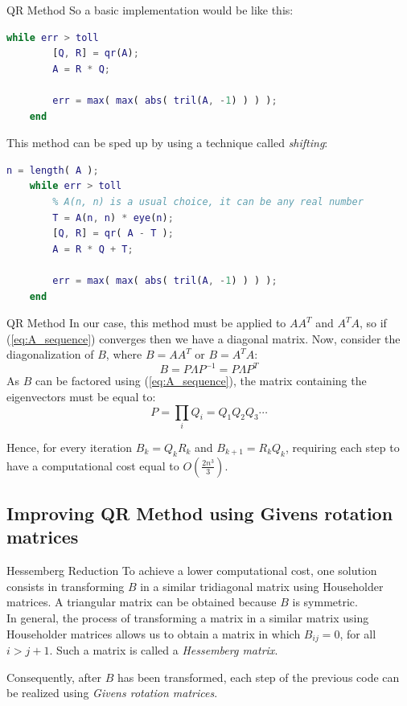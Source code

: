 \documentclass[10pt]{beamer}
\begin{document}
\begin{frame}[fragile]{QR Method}
    So a basic implementation would be like this:
    \begin{lstlisting}[language=Matlab]
    while err > toll
        [Q, R] = qr(A);
        A = R * Q;

        err = max( max( abs( tril(A, -1) ) ) );
    end \end{lstlisting}
    This method can be sped up by using a technique called \textit{shifting}:
    \begin{lstlisting}[language=Matlab]
    n = length( A );
    while err > toll
        % A(n, n) is a usual choice, it can be any real number
        T = A(n, n) * eye(n);
        [Q, R] = qr( A - T );
        A = R * Q + T;

        err = max( max( abs( tril(A, -1) ) ) );
    end \end{lstlisting}
\end{frame}

\begin{frame}{QR Method}
    In our case, this method must be applied to $A A^T$ and $A^T A$, so if (\ref{eq:A_sequence}) converges then we have a diagonal matrix. \newline
    Now, consider the diagonalization of $B$, where $B = A A^T$ or $B = A^T A$:
    $$
    B = P \Lambda P^{-1} =  P \Lambda P^T
    $$
    As $B$ can be factored using (\ref{eq:A_sequence}), the matrix containing the eigenvectors must be equal to:
    $$
    P = \prod_i Q_i = Q_1 Q_2 Q_3 \cdots
    $$ \bigskip

    Hence, for every iteration $B_k = Q_k R_k$ and $B_{k+1} = R_k Q_k$, requiring each step to have a computational cost equal to $O(\frac{2 n^3}{3})$.
\end{frame}

\subsection{Improving QR Method using Givens rotation matrices}

\begin{frame}{Hessemberg Reduction}
    To achieve a lower computational cost, one solution consists in transforming $B$ in a similar tridiagonal matrix using Householder matrices. \newline
    A triangular matrix can be obtained because $B$ is symmetric. \\  \bigskip
    In general, the process of transforming a matrix in a similar matrix using Householder matrices allows us to obtain a matrix in which $B_{ij} = 0$, for all $i > j + 1$. Such a matrix is called a \textit{Hessemberg matrix}. \bigskip

    Consequently, after $B$ has been transformed, each step of the previous code can be realized using \textit{Givens rotation matrices}.
\end{frame}
\end{document}
